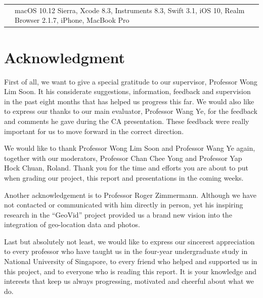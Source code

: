 \documentclass[12pt,a4paper]{article}
\begin{document}
        \begin{tabular}{ p{1cm} p{13cm} }
            &macOS 10.12 Sierra, Xcode 8.3, Instruments 8.3, Swift 3.1, iOS 10, Realm Browser 2.1.7,  iPhone, MacBook Pro \\
        \end{tabular}
        
    \clearpage
    
    
    \section*{Acknowledgment}
         First of all, we want to give a special gratitude to our supervisor, Professor Wong Lim Soon. It his considerate suggestions, information, feedback and supervision in the past eight months that has helped us progress this far. We would also like to express our thanks to our main evaluator, Professor Wang Ye, for the feedback and comments he gave during the CA presentation. These feedback were really important for us to move forward in the correct direction.
         
         We would like to thank Professor Wong Lim Soon and Professor Wang Ye again, together with our moderators, Professor Chan Chee Yong and Professor Yap Hock Chuan, Roland. Thank you for the time and efforts you are about to put when grading our project, this report and presentations in the coming weeks.
         
         Another acknowledgement is to Professor Roger Zimmermann. Although we have not contacted or communicated with him directly in person, yet his inspiring research in the ``GeoVid'' project provided us a brand new vision into the integration of geo-location data and photos.
         
         Last but absolutely not least, we would like to express our sincerest appreciation to every professor who have taught us in the four-year undergraduate study in National University of Singapore, to every friend who helped and supported us in this project, and to everyone who is reading this report. It is your knowledge and interests that keep us always progressing, motivated and cheerful about what we do.
    \clearpage
    
    \listoffigures
    
    \listoftables
    \clearpage
	
\end{document}
